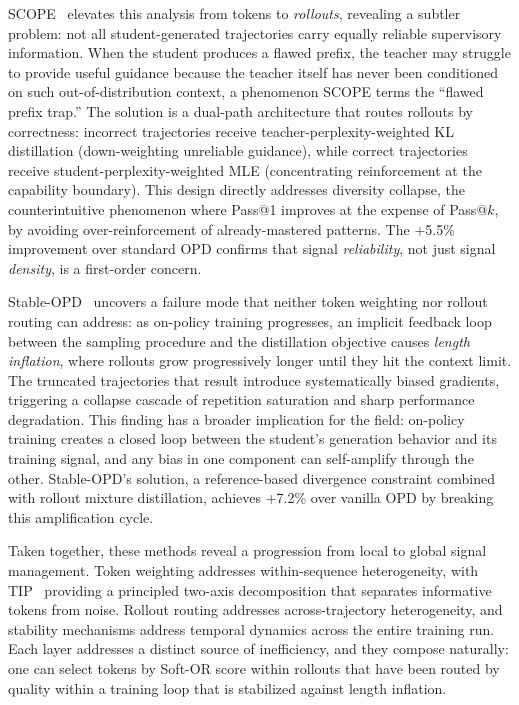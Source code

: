 \documentclass{article} %
\begin{document}
SCOPE~\citep{zheng2026scope} elevates this analysis from tokens to \emph{rollouts}, revealing a subtler problem: not all student-generated trajectories carry equally reliable supervisory information. When the student produces a flawed prefix, the teacher may struggle to provide useful guidance because the teacher itself has never been conditioned on such out-of-distribution context, a phenomenon SCOPE terms the ``flawed prefix trap.'' The solution is a dual-path architecture that routes rollouts by correctness: incorrect trajectories receive teacher-perplexity-weighted KL distillation (down-weighting unreliable guidance), while correct trajectories receive student-perplexity-weighted MLE (concentrating reinforcement at the capability boundary). This design directly addresses diversity collapse, the counterintuitive phenomenon where Pass@1 improves at the expense of Pass@$k$, by avoiding over-reinforcement of already-mastered patterns. The +5.5\% improvement over standard OPD confirms that signal \emph{reliability}, not just signal \emph{density}, is a first-order concern.

Stable-OPD~\citep{luo2026demystifying} uncovers a failure mode that neither token weighting nor rollout routing can address: as on-policy training progresses, an implicit feedback loop between the sampling procedure and the distillation objective causes \emph{length inflation}, where rollouts grow progressively longer until they hit the context limit. The truncated trajectories that result introduce systematically biased gradients, triggering a collapse cascade of repetition saturation and sharp performance degradation. This finding has a broader implication for the field: on-policy training creates a closed loop between the student's generation behavior and its training signal, and any bias in one component can self-amplify through the other. Stable-OPD's solution, a reference-based divergence constraint combined with rollout mixture distillation, achieves +7.2\% over vanilla OPD by breaking this amplification cycle.

Taken together, these methods reveal a progression from local to global signal management. Token weighting addresses within-sequence heterogeneity, with TIP~\citep{xu2026tip} providing a principled two-axis decomposition that separates informative tokens from noise. Rollout routing addresses across-trajectory heterogeneity, and stability mechanisms address temporal dynamics across the entire training run. Each layer addresses a distinct source of inefficiency, and they compose naturally: one can select tokens by Soft-OR score within rollouts that have been routed by quality within a training loop that is stabilized against length inflation.
\end{document}

